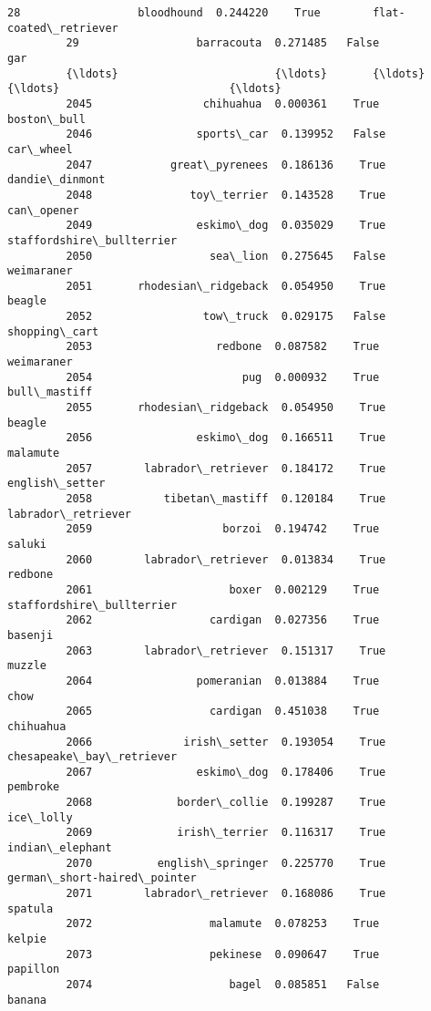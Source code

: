\documentclass[11pt]{article}
\begin{document}
\begin{Verbatim}[commandchars=\\\{\}]
         28                  bloodhound  0.244220    True        flat-coated\_retriever   
         29                  barracouta  0.271485   False                          gar   
         {\ldots}                        {\ldots}       {\ldots}     {\ldots}                          {\ldots}   
         2045                 chihuahua  0.000361    True                  boston\_bull   
         2046                sports\_car  0.139952   False                    car\_wheel   
         2047            great\_pyrenees  0.186136    True               dandie\_dinmont   
         2048               toy\_terrier  0.143528    True                   can\_opener   
         2049                eskimo\_dog  0.035029    True    staffordshire\_bullterrier   
         2050                  sea\_lion  0.275645   False                   weimaraner   
         2051       rhodesian\_ridgeback  0.054950    True                       beagle   
         2052                 tow\_truck  0.029175   False                shopping\_cart   
         2053                   redbone  0.087582    True                   weimaraner   
         2054                       pug  0.000932    True                 bull\_mastiff   
         2055       rhodesian\_ridgeback  0.054950    True                       beagle   
         2056                eskimo\_dog  0.166511    True                     malamute   
         2057        labrador\_retriever  0.184172    True               english\_setter   
         2058           tibetan\_mastiff  0.120184    True           labrador\_retriever   
         2059                    borzoi  0.194742    True                       saluki   
         2060        labrador\_retriever  0.013834    True                      redbone   
         2061                     boxer  0.002129    True    staffordshire\_bullterrier   
         2062                  cardigan  0.027356    True                      basenji   
         2063        labrador\_retriever  0.151317    True                       muzzle   
         2064                pomeranian  0.013884    True                         chow   
         2065                  cardigan  0.451038    True                    chihuahua   
         2066              irish\_setter  0.193054    True     chesapeake\_bay\_retriever   
         2067                eskimo\_dog  0.178406    True                     pembroke   
         2068             border\_collie  0.199287    True                    ice\_lolly   
         2069             irish\_terrier  0.116317    True              indian\_elephant   
         2070          english\_springer  0.225770    True  german\_short-haired\_pointer   
         2071        labrador\_retriever  0.168086    True                      spatula   
         2072                  malamute  0.078253    True                       kelpie   
         2073                  pekinese  0.090647    True                     papillon   
         2074                     bagel  0.085851   False                       banana   
         

\end{Verbatim}
\end{document}
